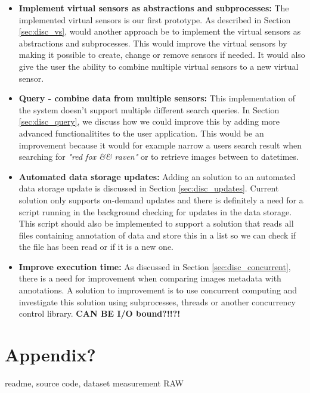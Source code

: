 \documentclass[USenglish]{uit-thesis}
\begin{document}
\begin{itemize}
\item \textbf{Implement virtual sensors as abstractions and subprocesses:} The implemented virtual sensors is our first prototype. As described in Section \ref{sec:disc_vs}, would another approach be to implement the virtual sensors as abstractions and subprocesses. This would improve the virtual sensors by making it possible to create, change or remove sensors if needed. It would also give the user the ability to combine multiple virtual sensors to a new virtual sensor.

\item \textbf{Query - combine data from multiple sensors:} This implementation of the system doesn't support multiple different search queries. In Section \ref{sec:disc_query}, we discuss how we could improve this by adding more advanced functionalitites to the user application. This would be an improvement because it would for example narrow a users search result when searching for \textit{"red fox \&\& raven"} or to retrieve images between to datetimes. 

\item \textbf{Automated data storage updates:} Adding an solution to an automated data storage update is discussed in Section \ref{sec:disc_updates}. Current solution only supports on-demand updates and there is definitely a need for a script running in the background checking for updates in the data storage. This script should also be implemented to support a solution that reads all files containing annotation of data and store this in a list so we can check if the file has been read or if it is a new one.


\item \textbf{Improve execution time:} As discussed in Section \ref{sec:disc_concurrent}, there is a need for improvement when comparing images metadata with annotations. A solution to improvement is to use concurrent computing and investigate this solution using subprocesses, threads or another concurrency control library. \textbf{CAN BE I/O bound?!!?!}

\end{itemize}


\chapter{Appendix?}
readme, source code, dataset measurement RAW
\backmatter


\end{document}
